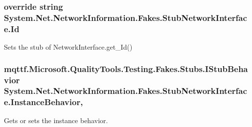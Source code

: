 \hypertarget{class_system_1_1_net_1_1_network_information_1_1_fakes_1_1_stub_network_interface_ac31d01d03e378f5868525eaa9ca1c6b6}{
\subsubsection[{Id}]{\setlength{\rightskip}{0pt plus 5cm}override string System.\-Net.\-Network\-Information.\-Fakes.\-Stub\-Network\-Interface.\-Id\hspace{0.3cm}{\ttfamily [get]}}}\label{class_system_1_1_net_1_1_network_information_1_1_fakes_1_1_stub_network_interface_ac31d01d03e378f5868525eaa9ca1c6b6}


Sets the stub of Network\-Interface.\-get\-\_\-\-Id()

\hypertarget{class_system_1_1_net_1_1_network_information_1_1_fakes_1_1_stub_network_interface_a16edb0b4c2926396d8c9e2488f8b04f8}{
\subsubsection[{Instance\-Behavior}]{\setlength{\rightskip}{0pt plus 5cm}mqttf.\-Microsoft.\-Quality\-Tools.\-Testing.\-Fakes.\-Stubs.\-I\-Stub\-Behavior System.\-Net.\-Network\-Information.\-Fakes.\-Stub\-Network\-Interface.\-Instance\-Behavior\hspace{0.3cm}{\ttfamily [get]}, {\ttfamily [set]}}}\label{class_system_1_1_net_1_1_network_information_1_1_fakes_1_1_stub_network_interface_a16edb0b4c2926396d8c9e2488f8b04f8}


Gets or sets the instance behavior.

